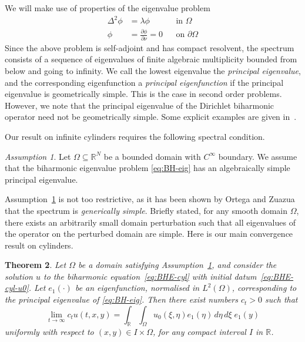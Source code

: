 \documentclass[a4paper, reqno,titlepage]{amsart}
\numberwithin{equation}{section}
\theoremstyle{plain}
\newtheorem{theorem}{Theorem}[section]
\theoremstyle{definition}
\theoremstyle{remark}
\newtheorem{assumption}[theorem]{Assumption}
\newcommand{\RR}{\mathbb{R}}
\begin{document}
We will make use of properties of the eigenvalue problem
\begin{equation}
  \label{eq:BH-eig}
  \begin{aligned}
    \Delta^2 \phi & = \lambda \phi                           &  & \text{in } \Omega         \\
    \phi          & = \frac{\partial \phi}{\partial \nu} = 0 &  & \text{on } \partial\Omega
  \end{aligned}
\end{equation}
Since the above problem is self-adjoint and has compact resolvent, the spectrum consists of a sequence of eigenvalues of finite algebraic multiplicity bounded from below and going to infinity. We call the lowest eigenvalue the \emph{principal eigenvalue}, and the corresponding eigenfunction a \emph{principal eigenfunction} if the principal eigenvalue is geometrically simple. This is the case in second order problems. However, we note that the principal eigenvalue of the Dirichlet biharmonic operator need not be geometrically simple. Some explicit examples are given in~\cite[Section 3]{SS20}.

Our result on infinite cylinders requires the following spectral condition.
\begin{assumption}
  \label{simple}
  Let $\Omega \subseteq \RR^N$ be a bounded domain with $C^\infty$ boundary. We assume that the biharmonic eigenvalue problem \eqref{eq:BH-eig} has an algebraically simple principal eigenvalue.
\end{assumption}

Assumption~\ref{simple} is not too restrictive, as it has been shown by Ortega and Zuazua~\cite{OZ} that the spectrum is \emph{generically simple}. Briefly stated, for any smooth domain $\Omega$, there exists an arbitrarily small domain perturbation such that all eigenvalues of the operator on the perturbed domain are simple. Here is our main convergence result on cylinders.

\begin{theorem}
  \label{thm:BHE-cyl}
  Let $\Omega$ be a domain satisfying Assumption~\ref{simple}, and consider the solution $u$ to the biharmonic equation~\eqref{eq:BHE-cyl} with initial datum~\eqref{eq:BHE-cyl-u0}. Let $e_1(\cdot)$ be an eigenfunction, normalised in $L^2(\Omega)$, corresponding to the principal eigenvalue of \eqref{eq:BH-eig}. Then there exist numbers $c_t > 0$ such that
  \begin{equation}
    \label{eq:BHE-cyl-blowup-limit}
    \lim_{t\to\infty}c_t u(t,x,y)
    =\int_{\RR}\int_\Omega u_0(\xi,\eta) e_1(\eta) \,d\eta\,d\xi \; e_1(y)
  \end{equation}
  uniformly with respect to $(x,y)\in I \times \Omega$, for any compact interval $I$ in $\RR$.
\end{theorem}
\end{document}
